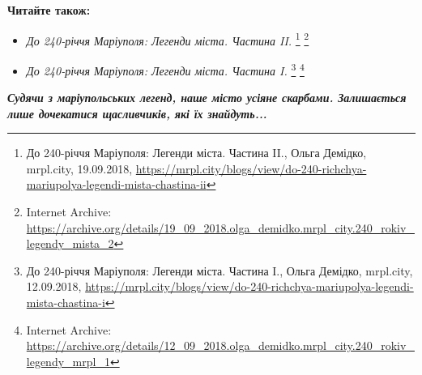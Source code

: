 \textbf{Читайте також:} 

\begin{itemize}
\item \emph{До 240-річчя Маріуполя: Легенди міста. Частина II.}%
\footnote{До 240-річчя Маріуполя: Легенди міста. Частина II., Ольга Демідко, mrpl.city, 19.09.2018, \url{https://mrpl.city/blogs/view/do-240-richchya-mariupolya-legendi-mista-chastina-ii}} %
\footnote{Internet Archive: \url{https://archive.org/details/19_09_2018.olga_demidko.mrpl_city.240_rokiv_legendy_mista_2}}

\item \emph{До 240-річчя Маріуполя: Легенди міста. Частина I.}%
\footnote{До 240-річчя Маріуполя: Легенди міста. Частина I., Ольга Демідко, mrpl.city, 12.09.2018, \url{https://mrpl.city/blogs/view/do-240-richchya-mariupolya-legendi-mista-chastina-i}} %
\footnote{Internet Archive: \url{https://archive.org/details/12_09_2018.olga_demidko.mrpl_city.240_rokiv_legendy_mrpl_1}}

\end{itemize}

\begin{center}
\em\bfseries Судячи з маріупольських легенд, наше місто усіяне скарбами. Залишається лише
дочекатися щасливчиків, які їх знайдуть...
\end{center}
